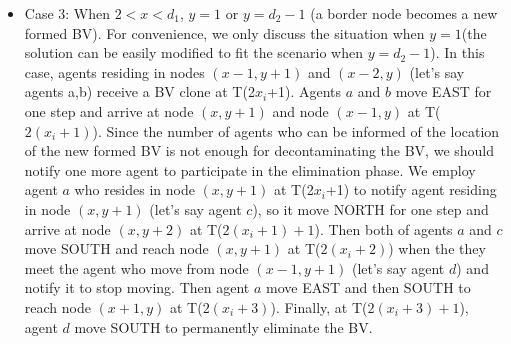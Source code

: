 \begin{itemize}
\item Case 3: When $2<x<d_1$, $y=1$ or $y=d_2-1$ (a border node becomes a new formed BV). For convenience, we only discuss the situation when $y=1$(the solution can be easily modified to fit the scenario when $y=d_2-1$). In this case, agents residing in nodes $(x-1, y+1)$ and $(x-2, y)$ (let's say agents a,b) receive a BV clone at T(2$x_i$+1). Agents $a$ and $b$ move EAST for one step and arrive at node $(x, y+1)$ and node $(x-1, y)$ at T($2(x_i+1)$). Since the number of agents who can be informed of the location of the new formed BV is not enough for decontaminating the BV, we should notify one more agent to participate in the elimination phase. We employ agent $a$ who resides in node $(x, y+1)$ at T(2$x_i$+1) to notify agent residing in node $(x, y+1)$ (let's say agent $c$), so it move NORTH for one step and arrive at node $(x, y+2)$ at T($2(x_i+1)+1$). Then both of agents $a$ and $c$ move SOUTH and reach node $(x, y+1)$ at T($2(x_i+2)$) when the they meet the agent who move from node $(x-1, y+1)$ (let's say agent $d$) and notify it to stop moving. Then agent $a$ move EAST and then SOUTH to reach node $(x+1, y)$ at T($2(x_i+3)$). Finally, at T($2(x_i+3)+1$), agent $d$ move SOUTH to permanently eliminate the BV.


\end{itemize}
